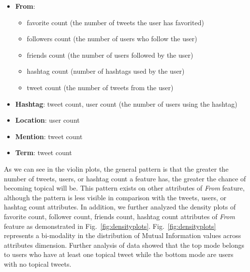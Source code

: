 \begin{itemize}
\item \textbf{From}: 
\begin{itemize}
\item favorite count (the number of tweets the user has favorited)
\item followers count (the number of users who follow the user)
\item friends count (the number of users followed by the user)
\item hashtag count (number of hashtags used by the user)
\item tweet count (the number of tweets from the user)
 \end{itemize}
\item \textbf{Hashtag}: tweet count, user count (the number of users using the hashtag)
\item \textbf{Location}: user count
\item \textbf{Mention}: tweet count
\item \textbf{Term}: tweet count
\end{itemize}

As we can see in the violin plots, the general pattern is that the greater the number of tweets, users, or hashtag count a feature has, the greater the chance of becoming topical will be. This pattern exists on other attributes of \textit{From} feature, although the pattern is less visible in comparison with the tweets, users, or hashtag count attributes. 
In addition, we further analyzed the density plots of favorite count, follower count, friends count, hashtag count attributes of \textit{From} feature as demonstrated in Fig.~\ref{fig:densityplots}. Fig.~\ref{fig:densityplots} represents a bi-modality in the distribution of Mutual Information values across attributes dimension. Further analysis of data showed that the top mode belongs to users who have at least one topical tweet while the bottom mode are users with no topical tweets.

